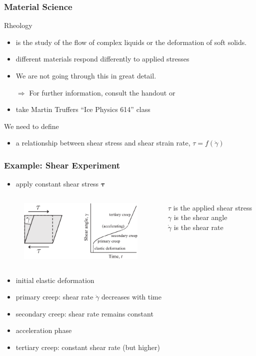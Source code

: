 \documentclass[hide notes,intlimits]{beamer}
\begin{document}
\begin{frame}
  \frametitle{Material Science}
  \begin{block}{Rheology}
    \begin{itemize}
    \item is the study of the flow of complex liquids or the deformation of soft solids.
    \item different materials respond differently to applied stresses
    \item We are not going through this in great detail.
    \item[$\Rightarrow$] For further information, consult the handout or
      \item take Martin Truffers ``Ice Physics 614''  class
    \end{itemize}
  \end{block}
  \begin{block}{We need to define}
    \begin{itemize}
   \item a relationship between shear stress and shear strain rate, $\tau = f(\dot \gamma)$
   \end{itemize}
  \end{block}
\end{frame}


\begin{frame}
  \frametitle{Example: Shear Experiment}
  \begin{itemize}
    \item apply constant shear stress $\boldsymbol{\tau}$
\end{itemize}
  \begin{columns}
    \column[c]{8cm}
    \begin{figure}
      \includegraphics[width=6cm]{figures/fig_4_04}
    \end{figure}
    \column[c]{5cm}
    $\tau$ is the applied shear stress\\
    $\gamma$ is the shear angle\\
    $\dot\gamma$ is the shear rate
  \end{columns}
  \begin{itemize}
    \item initial elastic deformation
    \item primary creep: shear rate $\dot\gamma$ decreases with time
    \item \alert{secondary creep}: shear rate remains constant
    \item acceleration phase
    \item tertiary creep: constant shear rate (but higher) 
 \end{itemize}
\end{frame}
\end{document}

